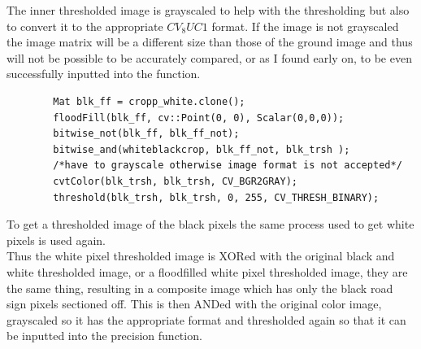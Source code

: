 \documentclass{article}
\begin{document}
The inner thresholded image is grayscaled to help with the thresholding but also to convert it to the appropriate $CV_8UC1$ format. If the image is not grayscaled the image matrix will be a different size than those of the ground image and thus will not be possible to be accurately compared, or as I found early on, to be even successfully inputted into the function.\\
\begin{lstlisting}
		Mat blk_ff = cropp_white.clone();
		floodFill(blk_ff, cv::Point(0, 0), Scalar(0,0,0));
		bitwise_not(blk_ff, blk_ff_not);
		bitwise_and(whiteblackcrop, blk_ff_not, blk_trsh );
		/*have to grayscale otherwise image format is not accepted*/
		cvtColor(blk_trsh, blk_trsh, CV_BGR2GRAY);
		threshold(blk_trsh, blk_trsh, 0, 255, CV_THRESH_BINARY);
\end{lstlisting}
To get a thresholded image of the black pixels the same process used to get white pixels is used again. \\
Thus the white pixel thresholded image is XORed with the original black and white thresholded image, or a floodfilled white pixel thresholded image, they are the same thing, resulting in a composite image which has only the black road sign pixels sectioned off. This is then ANDed with the original color image, grayscaled so it has the appropriate format and thresholded again so that it can be inputted into the precision function.\\
\end{document}
